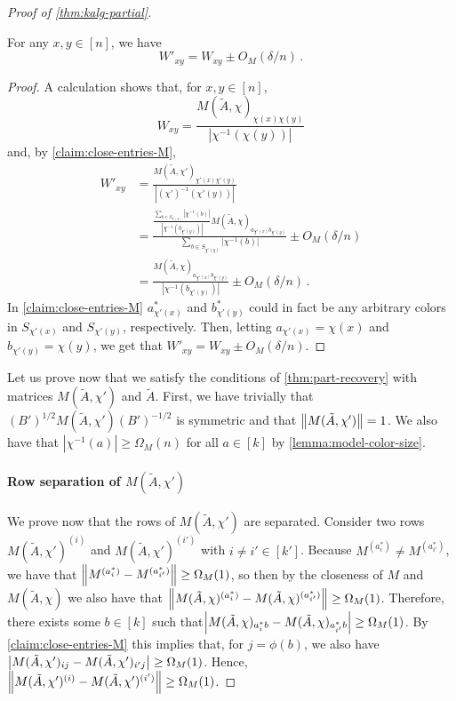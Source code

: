 \begin{proof}[Proof of \cref{thm:kalg-partial}]
    \begin{claim}
    \label{claim:close-entries-W}
    For any $x, y \in [n]$, we have 
    \begin{equation*}
    W'_{xy} = W_{xy} \pm O_M(\delta/n)\,.
    \end{equation*}
    \end{claim}
    \begin{proof}
    A calculation shows that, for $x,y \in [n]$,
    \[W_{xy} = \frac{M(\tilde{A}, \chi)_{\chi(x)\chi(y)}}{|\chi^{-1}(\chi(y))|}\] 
    and, by \cref{claim:close-entries-M}, 
    \begin{align*}
    W'_{xy}
    &= \frac{M(\tilde{A}, \chi')_{\chi'(x)\chi'(y)}}{|(\chi')^{-1}(\chi'(y))|}\\
    &= \frac{ \frac{\sum_{b \in S_{\chi'(y)}} |\chi^{-1}(b)|}{|\chi^{-1}(b_{\chi'(y)})|} M(\tilde{A}, \chi)_{a_{\chi'(x)}b_{\chi'(y)}}}{\sum_{b \in S_{\chi'(y)}} |\chi^{-1}(b)|} \pm O_M(\delta/n)\\
    &= \frac{ M(\tilde{A}, \chi)_{a_{\chi'(x)}b_{\chi'(y)}}}{|\chi^{-1}(b_{\chi'(y)})|} \pm O_M(\delta/n)\,.
    \end{align*}
    In \cref{claim:close-entries-M} $a^*_{\chi'(x)}$ and $b^*_{\chi'(y)}$ could in fact be any arbitrary colors in $S_{\chi'(x)}$ and $S_{\chi'(y)}$, respectively.
    Then, letting $a_{\chi'(x)} = \chi(x)$ and $b_{\chi'(y)} = \chi(y)$, we get that $W'_{xy} = W_{xy} \pm O_M(\delta/n)$.
    \end{proof}

    Let us prove now that we satisfy the conditions of \cref{thm:part-recovery} with matrices $M(\tilde{A}, \chi')$ and $\tilde{A}$.
    First, we have trivially that $(B')^{1/2} M(\tilde{A}, \chi') (B')^{-1/2}$ is symmetric and that $\left\lVert M(\tilde{A}, \chi')\right\rVert = 1$.
    We also have that $|\chi^{-1}(a)| \geq \Omega_M(n)$ for all $a \in [k]$ by \cref{lemma:model-color-size}.
    
    \paragraph{Row separation of $M(\tilde{A}, \chi')$}
    We prove now that the rows of $M(\tilde{A}, \chi')$ are separated.
    Consider two rows $M(\tilde{A}, \chi')^{(i)}$ and $M(\tilde{A}, \chi')^{(i')}$ with $i \neq i' \in [k']$.
    Because $M^{(a^*_i)} \neq M^{(a^*_{i'})}$, we have that $\left\lVert M^{(a^*_i)} - M^{(a^*_{i'})}\right\rVert \geq \Omega_M(1)$, so then by the closeness of $M$ and $M(\tilde{A}, \chi)$ we also have that $\left\lVert M(\tilde{A}, \chi)^{(a^*_i)} - M(\tilde{A}, \chi)^{(a^*_{i'})}\right\rVert \geq \Omega_M(1)$.
    Therefore, there exists some $b \in [k]$ such that\linebreak $\left\lvert M(\tilde{A}, \chi)_{a^*_ib} - M(\tilde{A}, \chi)_{a^*_{i'}b}\right\rvert \geq \Omega_M(1)$.
    By \cref{claim:close-entries-M} this implies that, for $j = \phi(b)$, we also have $\left\lvert M(\tilde{A}, \chi')_{i j} - M(\tilde{A}, \chi')_{i' j}\right\rvert \geq \Omega_M(1)$.
    Hence, $\left\lVert M(\tilde{A}, \chi')^{(i)} - M(\tilde{A}, \chi')^{(i')}\right\rVert \geq \Omega_M(1)$.


\end{proof}
